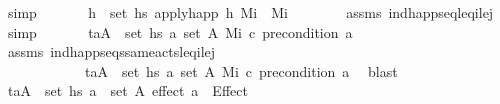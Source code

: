 \begin{isabellebody}
\ simp\isanewline
\ \ \ \ \isamarkupfalse%
\ {}{\isacharcolon}{\kern0pt}\ {\isachardoublequoteopen}{\isasymforall}h\ {\isasymin}\ set\ {\isacharquery}{\kern0pt}hs\ apply{\isacharunderscore}{\kern0pt}happ\ h\ M\isactrlsub i\ {\isacharequal}{\kern0pt}\ M\isactrlsub i{\isachardoublequoteclose}\isanewline
\ \ \ \ \ \ \isamarkupfalse%
\ assms\ ind{\isacharunderscore}{\kern0pt}happ{\isacharunderscore}{\kern0pt}seq{\isacharunderscore}{\kern0pt}leq\isactrlsub i{\isacharunderscore}{\kern0pt}le\isactrlsub j\ \isamarkupfalse%
\ simp\isanewline
\ \ \ \ \isamarkupfalse%
\ {}{\isacharcolon}{\kern0pt}\ {\isachardoublequoteopen}{\isasymforall}{\isacharparenleft}{\kern0pt}t\isactrlsub a{\isacharcomma}{\kern0pt}A{\isacharparenright}{\kern0pt}\ {\isasymin}\ set\ {\isacharquery}{\kern0pt}hs\ {\isasymforall}a{\isasymin}\ set\ A{\isachardot}{\kern0pt}\ M\isactrlsub i\ \isactrlsup c{\isasymTTurnstile}\isactrlsub {\isacharequal}{\kern0pt}\ precondition\ a{\isachardoublequoteclose}\isanewline
\ \ \ \ \ \ \isamarkupfalse%
\ assms\ ind{\isacharunderscore}{\kern0pt}happ{\isacharunderscore}{\kern0pt}seqs{\isacharunderscore}{\kern0pt}same{\isacharunderscore}{\kern0pt}acts{\isacharunderscore}{\kern0pt}leq\isactrlsub i{\isacharunderscore}{\kern0pt}le\isactrlsub j\isanewline
\ \ \ \ \ \ \ \ \ \ \ \ {\isacartoucheopen}{\isasymforall}{\isacharparenleft}{\kern0pt}t\isactrlsub a{\isacharcomma}{\kern0pt}A{\isacharparenright}{\kern0pt}\ {\isasymin}\ set\ {\isacharquery}{\kern0pt}hs\ {\isasymforall}a{\isasymin}\ set\ A{\isachardot}{\kern0pt}\ M\isactrlsub i\ \isactrlsup c{\isasymTTurnstile}\isactrlsub {\isacharequal}{\kern0pt}\ precondition\ a{\isacartoucheclose}\ \isamarkupfalse%
\ blast\isanewline
\ \ \ \ \isamarkupfalse%
\ {\isachardoublequoteopen}{\isasymforall}{\isacharparenleft}{\kern0pt}t\isactrlsub a{\isacharcomma}{\kern0pt}A{\isacharparenright}{\kern0pt}\ {\isasymin}\ set\ {\isacharquery}{\kern0pt}hs\ {\isasymforall}a\ {\isasymin}\ set\ A{\isachardot}{\kern0pt}\ effect\ a\ {\isacharequal}{\kern0pt}\ Effect\ {\isacharbrackleft}{\kern0pt}{\isacharbrackright}{\kern0pt}\ {\isacharbrackleft}{\kern0pt}{\isacharbrackright}{\kern0pt}{\isachardoublequoteclose}\isanewline

\end{isabellebody}
